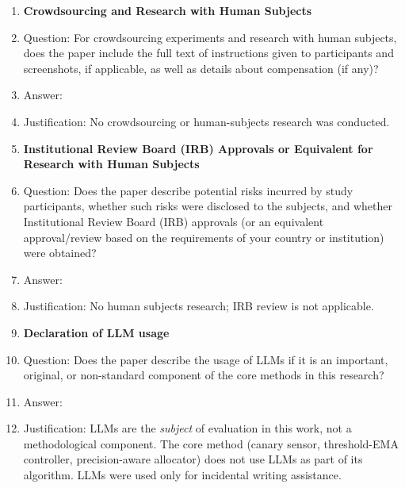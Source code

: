 \documentclass{article}
\begin{document}
\begin{enumerate}
\item {\bf Crowdsourcing and Research with Human Subjects}
\item[] Question: For crowdsourcing experiments and research with human subjects, does the paper include the full text of instructions given to participants and screenshots, if applicable, as well as details about compensation (if any)?
\item[] Answer: \answerNA{}
\item[] Justification: No crowdsourcing or human-subjects research was conducted.

\item {\bf Institutional Review Board (IRB) Approvals or Equivalent for Research with Human Subjects}
\item[] Question: Does the paper describe potential risks incurred by study participants, whether such risks were disclosed to the subjects, and whether Institutional Review Board (IRB) approvals (or an equivalent approval/review based on the requirements of your country or institution) were obtained?
\item[] Answer: \answerNA{}
\item[] Justification: No human subjects research; IRB review is not applicable.

\item {\bf Declaration of LLM usage}
\item[] Question: Does the paper describe the usage of LLMs if it is an important, original, or non-standard component of the core methods in this research?
\item[] Answer: \answerNA{}
\item[] Justification: LLMs are the \emph{subject} of evaluation in this work, not a methodological component. The core method (canary sensor, threshold-EMA controller, precision-aware allocator) does not use LLMs as part of its algorithm. LLMs were used only for incidental writing assistance.

\end{enumerate}
\end{document}
